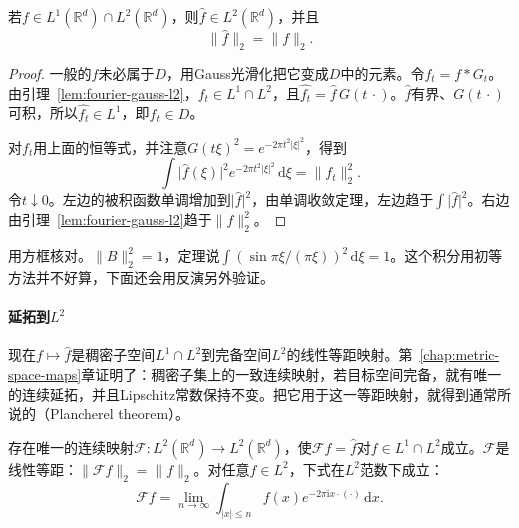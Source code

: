 \begin{theorem}[Plancherel恒等式]
\label{thm:fourier-plancherel-l1l2}
若$f\in L^1(\mathbb R^d)\cap L^2(\mathbb R^d)$，则$\widehat f\in L^2(\mathbb R^d)$，并且
\begin{equation}
\lVert\widehat f\rVert_2=\lVert f\rVert_2 .
\label{eq:fourier-plancherel-l1l2}
\end{equation}
\end{theorem}

\begin{proof}
一般的$f$未必属于$D$，用Gauss光滑化把它变成$D$中的元素。令$f_t=f*G_t$。由引理~\ref{lem:fourier-gauss-l2}，$f_t\in L^1\cap L^2$，且$\widehat{f_t}=\widehat f\,G(t\,\cdot)$。$\widehat f$有界、$G(t\,\cdot)$可积，所以$\widehat{f_t}\in L^1$，即$f_t\in D$。

对$f_t$用上面的恒等式，并注意$G(t\xi)^2=e^{-2\pi t^2\lvert\xi\rvert^2}$，得到
\[
\int\lvert\widehat f(\xi)\rvert^2e^{-2\pi t^2\lvert\xi\rvert^2}\,\mathrm d\xi=\lVert f_t\rVert_2^2.
\]
令$t\downarrow0$。左边的被积函数单调增加到$\lvert\widehat f\rvert^2$，由单调收敛定理，左边趋于$\int\lvert\widehat f\rvert^2$。右边由引理~\ref{lem:fourier-gauss-l2}趋于$\lVert f\rVert_2^2$。
\end{proof}

用方框核对。$\lVert B\rVert_2^2=1$，定理说$\int(\sin\pi\xi/(\pi\xi))^2\,\mathrm d\xi=1$。这个积分用初等方法并不好算，下面还会用反演另外验证。

\paragraph{延拓到$L^2$}

现在$f\mapsto\widehat f$是稠密子空间$L^1\cap L^2$到完备空间$L^2$的线性等距映射。第~\ref{chap:metric-space-maps}章证明了：稠密子集上的一致连续映射，若目标空间完备，就有唯一的连续延拓，并且Lipschitz常数保持不变。把它用于这一等距映射，就得到通常所说的（Plancherel theorem）。

\begin{theorem}[Plancherel定理]
\label{thm:fourier-plancherel}
存在唯一的连续映射$\mathcal F:L^2(\mathbb R^d)\to L^2(\mathbb R^d)$，使$\mathcal Ff=\widehat f$对$f\in L^1\cap L^2$成立。$\mathcal F$是线性等距：$\lVert\mathcal Ff\rVert_2=\lVert f\rVert_2$。对任意$f\in L^2$，下式在$L^2$范数下成立：
\begin{equation}
\mathcal Ff=\lim_{n\to\infty}\int_{\lvert x\rvert\leq n}f(x)e^{-2\pi\mathrm ix\cdot(\cdot)}\,\mathrm dx .
\label{eq:fourier-plancherel-limit}
\end{equation}
\end{theorem}

